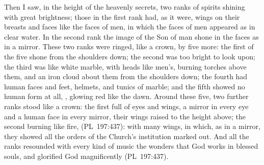 \noindent Then I saw, in the height of the heavenly secrets, two ranks of
spirits shining with great brightness; those in the first rank had, as it
were, wings on their breasts and faces like the faces of men, in which the
faces of men appeared as in clear water. In the second rank the image of the
Son of man shone in the faces as in a mirror. These two ranks were ringed,
like a crown, by five more: the first of the five shone from the shoulders
down; the second was too bright to look upon; the third was like white
marble, with heads like men's, burning torches above them, and an iron cloud
about them from the shoulders down; the fourth had human faces and feet,
helmets, and tunics of marble; and the fifth showed no human form at all,
, glowing red like the dawn. Around these five,
two further ranks stood like a crown: the first full of eyes and wings, a
mirror in every eye and a human face in every mirror, their wings raised to
the height above; the second burning like fire,  (PL~197:437): with many wings, in
which, as in a mirror, they showed all the orders of the Church's
institution marked out. And all the ranks resounded with every kind of
music the wonders that God works in blessed souls, and glorified God
magnificently (PL~197:437).

